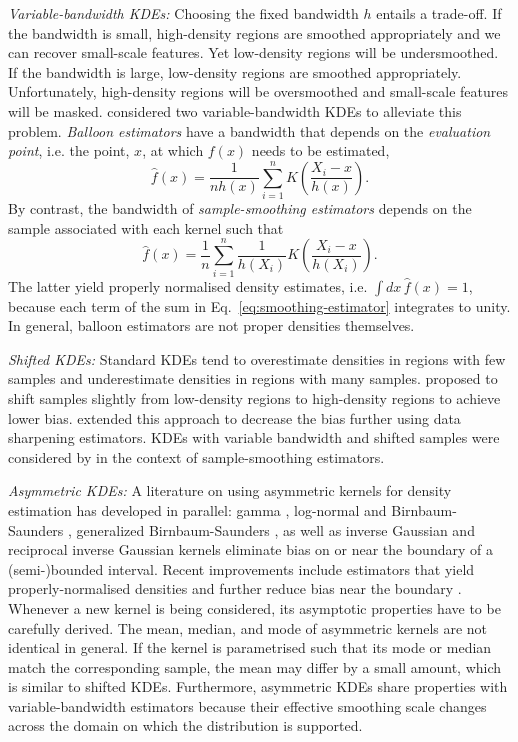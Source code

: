 \emph{Variable-bandwidth KDEs: }Choosing the fixed bandwidth $h$ entails a trade-off. If the bandwidth is small, high-density regions are smoothed appropriately and we can recover small-scale features. Yet low-density regions will be undersmoothed. If the bandwidth is large, low-density regions are smoothed appropriately. Unfortunately, high-density regions will be oversmoothed and small-scale features will be masked. \citet{Terrell1992} considered two variable-bandwidth KDEs to alleviate this problem. \emph{Balloon estimators} have a bandwidth that depends on the \emph{evaluation point}, i.e. the point, $x$, at which $f\left(x\right)$ needs to be estimated,
\begin{equation}
\hat{f}\left(x\right)=\frac{1}{nh\left(x\right)}\sum_{i=1}^{n}K\left(\frac{X_{i}-x}{h\left(x\right)}\right).\label{eq:balloon-estimator}
\end{equation}
By contrast, the bandwidth of \emph{sample-smoothing estimators} depends on the sample associated with each kernel such that
\begin{equation}
\hat{f}\left(x\right)=\frac{1}{n}\sum_{i=1}^{n}\frac{1}{h\left(X_{i}\right)}K\left(\frac{X_{i}-x}{h\left(X_{i}\right)}\right).\label{eq:smoothing-estimator}
\end{equation}
The latter yield properly normalised density estimates, i.e. $\int dx\,\hat{f}\left(x\right)=1$, because each term of the sum in Eq.~\eqref{eq:smoothing-estimator} integrates to unity. In general, balloon estimators are not proper densities themselves.

\emph{Shifted KDEs: }Standard KDEs tend to overestimate densities in regions with few samples and underestimate densities in regions with many samples. \citet{Samuiddin1990} proposed to shift samples slightly from low-density regions to high-density regions to achieve lower bias. \citet{Hall2002a} extended this approach to decrease the bias further using data sharpening estimators. KDEs with variable bandwidth and shifted samples were considered by \citet{Jones1994} in the context of sample-smoothing estimators. 

\emph{Asymmetric KDEs:} A literature on using asymmetric kernels for density estimation has developed in parallel: gamma \citep{Chen2000}, log-normal and Birnbaum-Saunders \citep{Jin2003}, generalized Birnbaum-Saunders \citep{Marchant2013}, as well as inverse Gaussian and reciprocal inverse Gaussian kernels \citep{Scaillet2004} eliminate bias on or near the boundary of a (semi-)bounded interval. Recent improvements include estimators that yield properly-normalised densities \citep{Kuruwita2010,Jeon2014} and further reduce bias near the boundary \citep{Malec2014}. Whenever a new kernel is being considered, its asymptotic properties have to be carefully derived. The mean, median, and mode of asymmetric kernels are not identical in general. If the kernel is parametrised such that its mode or median match the corresponding sample, the mean may differ by a small amount, which is similar to shifted KDEs. Furthermore, asymmetric KDEs share properties with variable-bandwidth estimators because their effective smoothing scale changes across the domain on which the distribution is supported.

